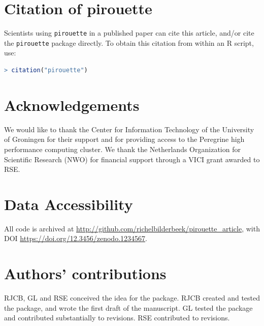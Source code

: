 \documentclass{article}
\begin{document}
\section{Citation of pirouette}

Scientists using \verb;pirouette; in a published paper can cite this
article, and/or cite the \verb;pirouette; package 
directly. To obtain this citation from within an R script, use:

\begin{lstlisting}[language=R]
> citation("pirouette")
\end{lstlisting}

\section{Acknowledgements}

We would like to thank the Center for Information Technology of the University 
of Groningen for their support and for providing access to the Peregrine 
high performance computing cluster. 
We thank the Netherlands 
Organization for Scientific Research (NWO) for financial support 
through a VICI grant awarded to RSE.

\section{Data Accessibility}

All code is archived at \url{http://github.com/richelbilderbeek/pirouette_article},
with DOI \url{https://doi.org/12.3456/zenodo.1234567}.

\section{Authors' contributions}

RJCB, GL and RSE conceived the idea for the package. 
RJCB created and tested the package, and wrote the first draft of the manuscript.
GL tested the package and contributed substantially to revisions.
RSE contributed to revisions.
\end{document}
